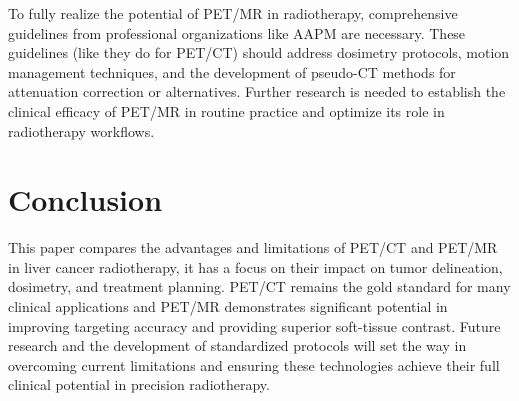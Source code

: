 \documentclass[11pt]{article} %
\begin{document}
\begin{multicols}{2}
To fully realize the potential of PET/MR in radiotherapy, comprehensive guidelines from professional organizations like AAPM are necessary. These guidelines (like they do for PET/CT) should address dosimetry protocols, motion management techniques, and the development of pseudo-CT methods for attenuation correction or alternatives. Further research is needed to establish the clinical efficacy of PET/MR in routine practice and optimize its role in radiotherapy workflows.

\section{Conclusion}

This paper compares the advantages and limitations of PET/CT and PET/MR in liver cancer radiotherapy, it has a focus on their impact on tumor delineation, dosimetry, and treatment planning. PET/CT remains the gold standard for many clinical applications and PET/MR demonstrates significant potential in improving targeting accuracy and providing superior soft-tissue contrast. Future research and the development of standardized protocols will set the way in overcoming current limitations and ensuring these technologies achieve their full clinical potential in precision radiotherapy.

\end{multicols}



\end{document}
